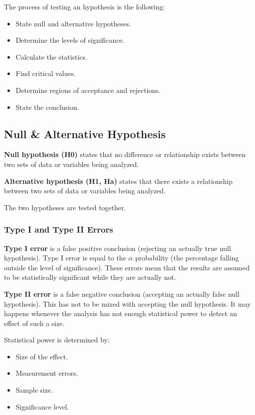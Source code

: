 \documentclass{article}
\begin{document}
The process of testing an hypothesis is the following:
\begin{itemize}
    \item State null and alternative hypotheses.
    \item Determine the levels of significance.
    \item Calculate the statistics.
    \item Find critical values.
    \item Determine regions of acceptance and rejections.
    \item State the conclusion.
\end{itemize}

\subsection{Null \& Alternative Hypothesis}
\textbf{Null hypothesis (H0)} states that no difference or relationship exists between two sets of data or variables being analyzed. 

\textbf{Alternative hypothesis (H1, Ha)} states that there exists a relationship between two sets of data or variables being analyzed. 

The two hypotheses are tested together. 

\subsubsection{Type I and Type II Errors}
\textbf{Type I error} is a false positive conclusion (rejecting an actually true null hypothesis). 
Type I error is equal to the $\alpha$ probability (the percentage falling outside the level of significance). These errors mean that the results are assumed to be statistically significant while they are actually not.

\textbf{Type II error} is a false negative conclusion (accepting an actually false null hypothesis). This has not to be mixed with accepting the null hypothesis. It may happens whenever the analysis has not enough statistical power to detect an effect of such a size. 

Statistical power is determined by:
\begin{itemize}
    \item Size of the effect.
    \item Measurement errors.
    \item Sample size.
    \item Significance level.
\end{itemize}
 
\end{document}
